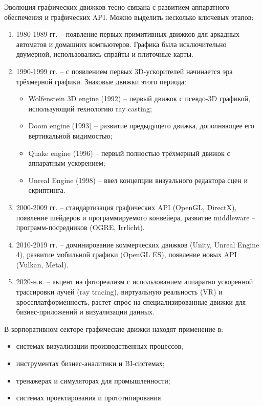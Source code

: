 Эволюция графических движков тесно связана с развитием аппаратного обеспечения и графических API. Можно выделить несколько ключевых этапов:

\begin{enumerate}
    \item 1980-1989 гг. -- появление первых примитивных движков для аркадных автоматов и домашних компьютеров. Графика была исключительно двумерной, использовались спрайты и плиточные карты.
    \item 1990-1999 гг. -- с появлением первых 3D-ускорителей начинается эра трёхмерной графики. Знаковые движки этого периода:
    \begin{itemize}[itemindent=\parindent,leftmargin=\parindent]
        \item Wolfenstein 3D engine (1992) -- первый движок с псевдо-3D графикой, использующий технологию ray casting;
        \item Doom engine (1993) -- развитие предыдущего движка, дополняющее его вертикальной видимостью;
        \item Quake engine (1996) -- первый полностью трёхмерный движок с аппаратным ускорением;
        \item Unreal Engine (1998) -- ввел концепции визуального редактора сцен и скриптинга.
    \end{itemize}
    \item 2000-2009 гг. -- стандартизация графических API (OpenGL, DirectX), появление шейдеров и программируемого конвейера, развитие middleware -- программ-посредников (OGRE, Irrlicht).
    \item 2010-2019 гг. -- доминирование коммерческих движков (Unity, Unreal Engine 4), развитие мобильной графики (OpenGL ES), появление новых API (Vulkan, Metal).
    \item 2020-н.в. -- акцент на фотореализм с использованием аппаратно ускоренной трассировки лучей (ray tracing), виртуальную реальность (VR) и кроссплатформенность, растет спрос на специализированные движки для бизнес-приложений и визуализации данных.
\end{enumerate}

В корпоративном секторе графические движки находят применение в:
\begin{itemize}
    \item системах визуализации производственных процессов;
    \item инструментах бизнес-аналитики и BI-системах;
    \item тренажерах и симуляторах для промышленности;
    \item системах проектирования и прототипирования.
\end{itemize}

